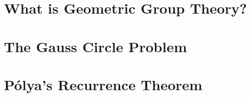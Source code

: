 \classheader{}
\section*{What is Geometric Group Theory?}


\section*{The Gauss Circle Problem}

\section*{P\'olya's Recurrence Theorem}